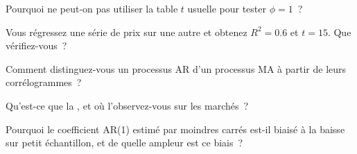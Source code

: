 \begin{interviewq}\label{iq:qm:linear-time-series:2}
Pourquoi ne peut-on pas utiliser la table $t$ usuelle pour tester $\phi = 1$~?
\end{interviewq}

\begin{interviewq}\label{iq:qm:linear-time-series:3}
Vous régressez une série de prix sur une autre et obtenez $R^2 = 0.6$ et $t = 15$. Que vérifiez-vous~?
\end{interviewq}

\begin{interviewq}\label{iq:qm:linear-time-series:4}
Comment distinguez-vous un processus AR d'un processus MA à partir de leurs corrélogrammes~?
\end{interviewq}

\begin{interviewq}\label{iq:qm:linear-time-series:5}
Qu'est-ce que la , et où l'observez-vous sur les marchés~?
\end{interviewq}

\begin{interviewq}\label{iq:qm:linear-time-series:6}
Pourquoi le coefficient AR(1) estimé par moindres carrés est-il biaisé à la baisse sur petit échantillon, et de quelle ampleur est ce biais~?
\end{interviewq}
